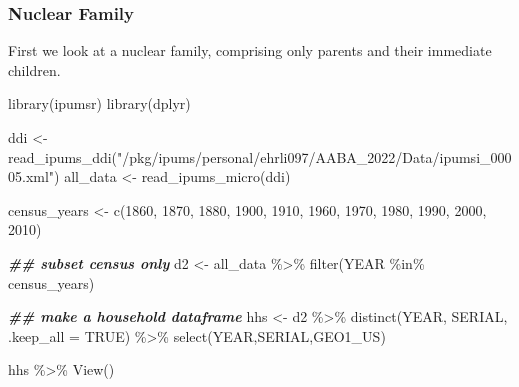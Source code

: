 \documentclass[
]{book}
\newenvironment{Shaded}{\begin{snugshade}}{\end{snugshade}}
\newcommand{\AttributeTok}[1]{\textcolor[rgb]{0.77,0.63,0.00}{#1}}
\newcommand{\ConstantTok}[1]{\textcolor[rgb]{0.00,0.00,0.00}{#1}}
\newcommand{\DecValTok}[1]{\textcolor[rgb]{0.00,0.00,0.81}{#1}}
\newcommand{\DocumentationTok}[1]{\textcolor[rgb]{0.56,0.35,0.01}{\textbf{\textit{#1}}}}
\newcommand{\FunctionTok}[1]{\textcolor[rgb]{0.00,0.00,0.00}{#1}}
\newcommand{\NormalTok}[1]{#1}
\newcommand{\OtherTok}[1]{\textcolor[rgb]{0.56,0.35,0.01}{#1}}
\newcommand{\SpecialCharTok}[1]{\textcolor[rgb]{0.00,0.00,0.00}{#1}}
\newcommand{\StringTok}[1]{\textcolor[rgb]{0.31,0.60,0.02}{#1}}
\begin{document}
\hypertarget{nuclear-family}{%
\subsubsection*{Nuclear Family}\label{nuclear-family}}

First we look at a nuclear family, comprising only parents and their immediate children.

\begin{Shaded}
\begin{Highlighting}[]
\FunctionTok{library}\NormalTok{(ipumsr)}
\FunctionTok{library}\NormalTok{(dplyr)}

\NormalTok{ddi }\OtherTok{\textless{}{-}} \FunctionTok{read\_ipums\_ddi}\NormalTok{(}\StringTok{"/pkg/ipums/personal/ehrli097/AABA\_2022/Data/ipumsi\_00005.xml"}\NormalTok{)}
\NormalTok{all\_data }\OtherTok{\textless{}{-}} \FunctionTok{read\_ipums\_micro}\NormalTok{(ddi)}

\NormalTok{census\_years }\OtherTok{\textless{}{-}} \FunctionTok{c}\NormalTok{(}\DecValTok{1860}\NormalTok{, }\DecValTok{1870}\NormalTok{, }\DecValTok{1880}\NormalTok{, }\DecValTok{1900}\NormalTok{, }\DecValTok{1910}\NormalTok{, }\DecValTok{1960}\NormalTok{, }\DecValTok{1970}\NormalTok{, }\DecValTok{1980}\NormalTok{, }\DecValTok{1990}\NormalTok{, }\DecValTok{2000}\NormalTok{, }\DecValTok{2010}\NormalTok{)}

\DocumentationTok{\#\# subset census only}
\NormalTok{d2 }\OtherTok{\textless{}{-}}\NormalTok{ all\_data }\SpecialCharTok{\%\textgreater{}\%} \FunctionTok{filter}\NormalTok{(YEAR }\SpecialCharTok{\%in\%}\NormalTok{ census\_years)}

\DocumentationTok{\#\# make a household dataframe}
\NormalTok{hhs }\OtherTok{\textless{}{-}}\NormalTok{ d2 }\SpecialCharTok{\%\textgreater{}\%} \FunctionTok{distinct}\NormalTok{(YEAR, SERIAL, }\AttributeTok{.keep\_all =} \ConstantTok{TRUE}\NormalTok{) }\SpecialCharTok{\%\textgreater{}\%} \FunctionTok{select}\NormalTok{(YEAR,SERIAL,GEO1\_US)}

\NormalTok{hhs }\SpecialCharTok{\%\textgreater{}\%} \FunctionTok{View}\NormalTok{()}
\end{Highlighting}
\end{Shaded}
\end{document}

